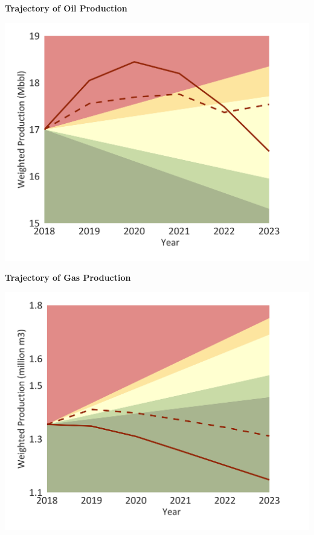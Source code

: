 \documentclass[10pt,table,a4]{article}\usepackage[]{graphicx}\usepackage[]{color}
\begin{document}
	\begin{minipage}[t]{.49\linewidth}
		\textbf{Trajectory of Oil Production }
		
		\includegraphics[trim = {0 0cm 0 0},width=1\linewidth]{CAFigures/Fig21}
		
	\end{minipage}	
	\hspace{.02\linewidth}
	\begin{minipage}[t]{.49\textwidth}
		\textbf{Trajectory of Gas Production }
		
		\includegraphics[trim = {0 0cm 0 0},width=1\linewidth]{CAFigures/Fig22}
		
	\end{minipage}
	
\end{document}
